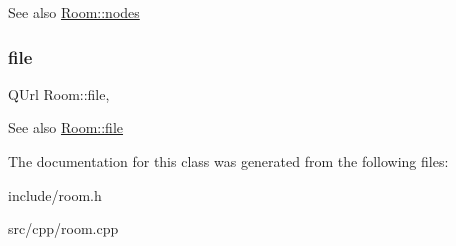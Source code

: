 \begin{DoxySeeAlso}{See also}
\mbox{\hyperlink{classRoom_a775521f64541cbe3a8ae8a37a008a3c2}{Room\+::nodes}} 
\end{DoxySeeAlso}
\mbox{\label{classRoom_a13e2ceb7b9470a01114bb50890b41ab7}} 
\subsubsection{\texorpdfstring{file}{file}}
{\footnotesize\ttfamily Q\+Url Room\+::file\hspace{0.3cm}{\ttfamily [read]}, {\ttfamily [write]}}

\begin{DoxySeeAlso}{See also}
\mbox{\hyperlink{classRoom_a13e2ceb7b9470a01114bb50890b41ab7}{Room\+::file}} 
\end{DoxySeeAlso}


The documentation for this class was generated from the following files\+:\begin{DoxyCompactItemize}
\item 
include/room.\+h\item 
src/cpp/room.\+cpp\end{DoxyCompactItemize}

